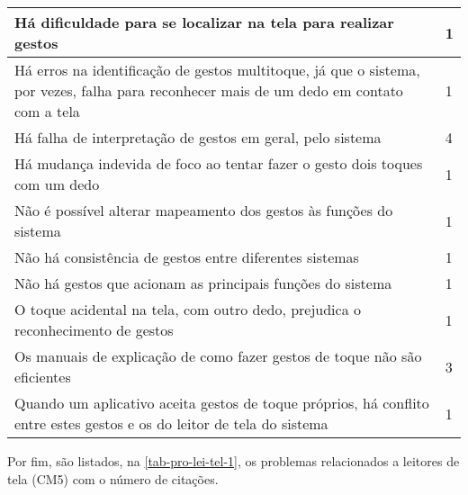 \begin{table}[htb]
\begin{center}
\begin{tabular}{p{13.1cm}|p{1.4cm}}
      \hline
      Há dificuldade para se localizar na tela para realizar gestos                                                                            & 1                 \\
      \hline
      Há erros na identificação de gestos multitoque, já que o sistema, por vezes, falha para reconhecer mais de um dedo em contato com a tela & 1                 \\
      \hline
      Há falha de interpretação de gestos em geral, pelo sistema                                                                               & 4                 \\
      \hline
      Há mudança indevida de foco ao tentar fazer o gesto dois toques com um dedo                                                              & 1                 \\
      \hline
      Não é possível alterar mapeamento dos gestos às funções do sistema                                                                       & 1                 \\
      \hline
      Não há consistência de gestos entre diferentes sistemas                                                                                  & 1                 \\
      \hline
      Não há gestos que acionam as principais funções do sistema                                                                               & 1                 \\
      \hline
      O toque acidental na tela, com outro dedo, prejudica o reconhecimento de gestos                                                          & 1                 \\
      \hline
      Os manuais de explicação de como fazer gestos de toque não são eficientes                                                                & 3                 \\
      \hline
      Quando um aplicativo aceita gestos de toque próprios, há conflito entre estes gestos e os do leitor de tela do sistema                   & 1                 \\
    \end{tabular}
  \end{center}
\end{table}

\newpage

Por fim, são listados, na \autoref{tab-pro-lei-tel-1}, os problemas relacionados a leitores de tela (CM5) com o número de citações.


